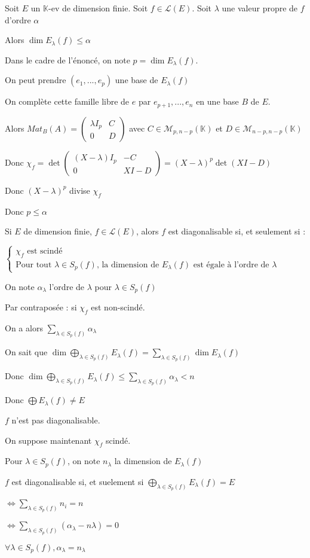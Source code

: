 \documentclass[a4paper,12pt]{book}
\newcommand{\Thr}[2]{\begin{tcolorbox}[sharp corners, colback=white,colframe=red!90!black!75, title=Théorème : #1]#2\end{tcolorbox}}
\newcommand{\Prop}[2]{\begin{tcolorbox}[sharp corners, colback=white,colframe=red!90!black!75, title=Proposition : #1]#2\end{tcolorbox}}
\newcommand{\Pre}[1]{\begin{tcolorbox}[sharp corners, colback=white,colframe=green!60!green!30!black!75, title=Preuve]#1\end{tcolorbox}}
\def\K{\mathbb{K}}
\begin{document}
\Thr{}{Soit $E$ un $\K$-ev de dimension finie. Soit $f\in\mathcal{L}(E)$. Soit $\lambda$ une valeur propre de $f$ d'ordre $\alpha$ \par Alors $\dim E_\lambda(f)\leq\alpha$}
\Pre{Dans le cadre de l'énoncé, on note $p=\dim E_\lambda(f)$. \par On peut prendre $(e_1,..., e_p)$ une base de $E_\lambda(f)$ \par On complète cette famille libre de $e$ par $e_{p+1}, ..., e_n$ en une base $B$ de $E$. \par Alors $Mat_B(A) = \begin{pmatrix} \lambda I_p & C\\ 0 & D\end{pmatrix}$ avec $C\in\mathcal{M}_{p,n-p}(\K)$ et $D\in\mathcal{M}_{n-p, n-p}(\K)$ \par Donc $\chi_f  = \det\begin{pmatrix}(X-\lambda)I_p & -C \\ 0 & XI-D \end{pmatrix} = (X-\lambda)^p\det(XI-D)$ \par Donc $(X-\lambda)^p$ divise $\chi_f$ \par Donc $p\leq\alpha$}
\Prop{Corollaire}{Si $E$ de dimension finie, $f\in\mathcal{L}(E)$, alors $f$ est diagonalisable si, et seulement si :
\par $\left\{\begin{array}{l} \chi_f\text{ est scindé} \\ \text{Pour tout }\lambda\in S_p(f)\text{, la dimension de }E_\lambda(f)\text{ est égale à l'ordre de }\lambda\end{array}\right.$}
\Pre{On note $\alpha_\lambda$ l'ordre de $\lambda$ pour $\lambda\in S_p(f)$ \par Par contraposée : si $\chi_f$ est non-scindé. \par On a alors $\sum\limits_{\lambda\in S_p(f)}\alpha_\lambda$ \par On sait que $\dim\bigoplus_{\lambda\in S_p(f)}E_\lambda(f)=\sum\limits_{\lambda\in S_p(f)}\dim E_\lambda(f)$ \par Donc $\dim\bigoplus_{\lambda\in S_p(f)}E_\lambda(f)\leq \sum\limits_{\lambda\in S_p(f)}\alpha_\lambda<n$ \par Donc $\bigoplus E_\lambda(f)\neq E$ \par $f$ n'est pas diagonalisable.
\par On suppose maintenant $\chi_f$ scindé. \par Pour $\lambda\in S_p(f)$, on note $n_\lambda$ la dimension de $E_\lambda(f)$ \par $f$ est diagonalisable si, et suelement si $\bigoplus\limits_{\lambda\in S_p(f)}E_\lambda(f)=E$ \par $\Leftrightarrow \sum\limits_{\lambda\in S_p(f)}n_i=n$ \par $\Leftrightarrow \sum\limits_{\lambda\in S_p(f)}(\alpha_\lambda-n\lambda)=0$ \par $\forall\lambda\in S_p(f),\alpha_\lambda=n_\lambda$}
\end{document}
